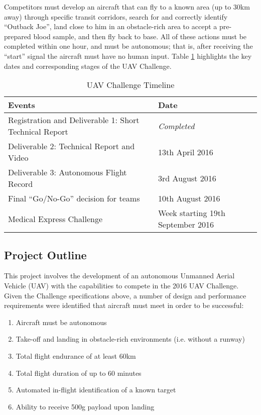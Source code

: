 Competitors must develop an aircraft that can fly to a known area (up to 30km away) through specific transit corridors, search for and correctly identify ``Outback Joe'', land close to him in an obstacle-rich area to accept a pre-prepared blood sample, and then fly back to base. All of these actions must be completed within one hour, and must be autonomous; that is, after receiving the ``start'' signal the aircraft must have no human input. Table \ref{tab:challenge} highlights the key dates and corresponding stages of the UAV Challenge.\\

\begin{table}[!ht]
	\caption{UAV Challenge Timeline}
	\label{tab:challenge}
	\centering
	\begin{tabular}{ | l | l | }
		\hline
		\textbf{Events} & \textbf{Date} \\ \hline \hline
		Registration and Deliverable 1: Short Technical Report & \textit{Completed} \\ \hline
		Deliverable 2: Technical Report and Video & 13th April 2016 \\ \hline
		Deliverable 3: Autonomous Flight Record & 3rd August 2016 \\ \hline
		Final ``Go/No-Go'' decision for teams & 10th August 2016 \\ \hline
		Medical Express Challenge & Week starting 19th September 2016 \\
		\hline
	\end{tabular}
\end{table}

\subsection{Project Outline}
This project involves the development of an autonomous Unmanned Aerial Vehicle (UAV) with the capabilities to compete in the 2016 UAV Challenge. Given the Challenge specifications above, a number of design and performance requirements were identified that aircraft must meet in order to be successful:
\begin{enumerate}[label=\bfseries R\arabic*:] \itemsep-2pt
	\item Aircraft must be autonomous
	\item Take-off and landing in obstacle-rich environments (i.e. without a runway)
	\item Total flight endurance of at least 60km
	\item Total flight duration of up to 60 minutes
	\item Automated in-flight identification of a known target
	\item Ability to receive 500g payload upon landing
\end{enumerate}

